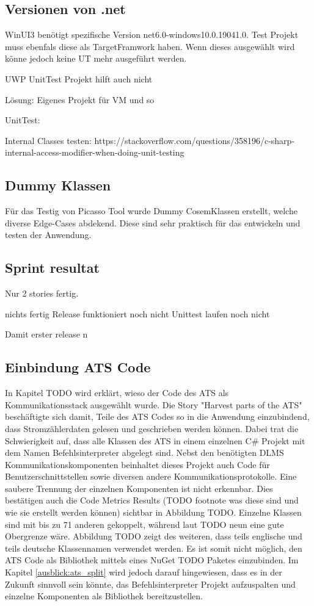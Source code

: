 \subsection{Versionen von .net}
WinUI3 benötigt spezifische Version net6.0-windows10.0.19041.0.
Test Projekt muss ebenfals diese als TargetFramwork haben.
Wenn dieses ausgewählt wird könne jedoch keine UT mehr ausgeführt werden.

UWP UnitTest Projekt hilft auch nicht

Lösung:
Eigenes Projekt für VM und so




UnitTest:

Internal Classes testen:
https://stackoverflow.com/questions/358196/c-sharp-internal-access-modifier-when-doing-unit-testing

\subsection{Dummy Klassen}
Für das Testig von Picasso Tool wurde Dummy CosemKlassen erstellt, welche diverse Edge-Cases abdekend.
Diese sind sehr praktisch für das entwickeln und testen der Anwendung.


\subsection{Sprint resultat}
Nur 2 stories fertig.


nichts fertig
Release funktioniert noch nicht
Unittest laufen noch nicht

Damit erster release n



\subsection{Einbindung ATS Code}
In Kapitel TODO wird erklärt, wieso der Code des \ac{ATS} als Kommunikationsstack ausgewählt wurde.
Die Story "Harvest parts of the ATS" beschäftigte sich damit, Teile des \ac{ATS} Codes so in die Anwendung einzubindend, dass Stromzählerdaten gelesen und geschrieben werden können.
Dabei trat die Schwierigkeit auf, dass alle Klassen des \ac{ATS} in einem einzelnen C\# Projekt mit dem Namen Befehlsinterpreter abgelegt sind.
Nebst den benötigten \ac{DLMS} Kommunikationskomponenten beinhaltet dieses Projekt auch Code für Benutzerschnittstellen sowie diversen andere Kommunikationsprotokolle.
Eine saubere Trennung der einzelnen Komponenten ist nicht erkennbar. 
Dies bestätigen auch die Code Metrics Results (TODO footnote was diese sind und wie sie erstellt werden können) sichtbar in Abbildung TODO.
Einzelne Klassen sind mit bis zu 71 anderen gekoppelt, während laut \parencite{quantitativeInvestigationRiskCodeMetrics} TODO neun eine gute Obergrenze wäre.
Abbildung TODO zeigt des weiteren, dass teils englische und teils deutsche Klassennamen verwendet werden.
Es ist somit nicht möglich, den \ac{ATS} Code als Bibliothek mittels eines NuGet TODO Paketes einzubinden.
Im Kapitel \ref{ausblick:ats_split} wird jedoch darauf hingewiesen, dass es in der Zukunft sinnvoll sein könnte,
das Befehlsinterpreter Projekt aufzuspalten und einzelne Komponenten als Bibliothek bereitzustellen.


